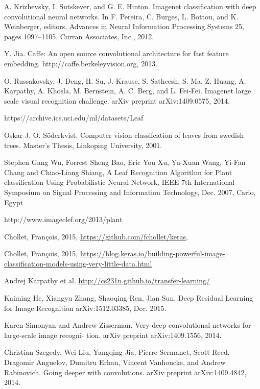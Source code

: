\documentclass[journal, 10pt]{IEEEtran}
\begin{document}
\begin{thebibliography}{1}
    A. Krizhevsky, I. Sutskever, and G. E. Hinton. Imagenet classification with deep convolutional neural networks. In F. Pereira, C. Burges, L. Bottou, and K. Weinberger, editors, Advances in Neural Information Processing Systems 25, pages 1097–1105. Curran Associates, Inc., 2012.

    Y. Jia. Caffe: An open source convolutional architecture for fast feature embedding. http://caffe.berkeleyvision.org, 2013.

    O. Russakovsky, J. Deng, H. Su, J. Krause, S. Satheesh, S. Ma, Z. Huang, A. Karpathy, A. Khosla, M. Bernstein, A. C. Berg, and L. Fei-Fei. Imagenet large scale visual recognition challenge. arXiv preprint arXiv:1409.0575, 2014.

    https://archive.ics.uci.edu/ml/datasets/Leaf

    Oskar J. O. Söderkvist. Computer vision classifcation of leaves from swedish trees. Master's Thesis, Linkoping University, 2001.

    Stephen Gang Wu, Forrest Sheng Bao, Eric You Xu, Yu-Xuan Wang, Yi-Fan Chang and Chiao-Liang Shiang, A Leaf Recognition Algorithm for Plant classification Using Probabilistic Neural Network, IEEE 7th International Symposium on Signal Processing and Information Technology, Dec. 2007, Cario, Egypt

    http://www.imageclef.org/2013/plant

    Chollet, Fran\c{c}ois, 2015, \url{https://github.com/fchollet/keras},

    Chollet, Fran\c{c}ois, 2015, \url{ https://blog.keras.io/building-powerful-image-classification-models-using-very-little-data.html}

    Andrej Karpathy et al. \url{http://cs231n.github.io/transfer-learning/}

    Kaiming He, Xiangyu Zhang, Shaoqing Ren, Jian Sun. Deep Residual Learning for Image Recognition 	arXiv:1512.03385, Dec. 2015.

  Karen Simonyan and Andrew Zisserman. Very deep convolutional networks for large-scale image recogni- tion. arXiv preprint arXiv:1409.1556, 2014.

  Christian Szegedy, Wei Liu, Yangqing Jia, Pierre Sermanet, Scott Reed, Dragomir Anguelov, Dumitru Erhan, Vincent Vanhoucke, and Andrew Rabinovich. Going deeper with convolutions. arXiv preprint arXiv:1409.4842, 2014.


\end{thebibliography}
\end{document}
